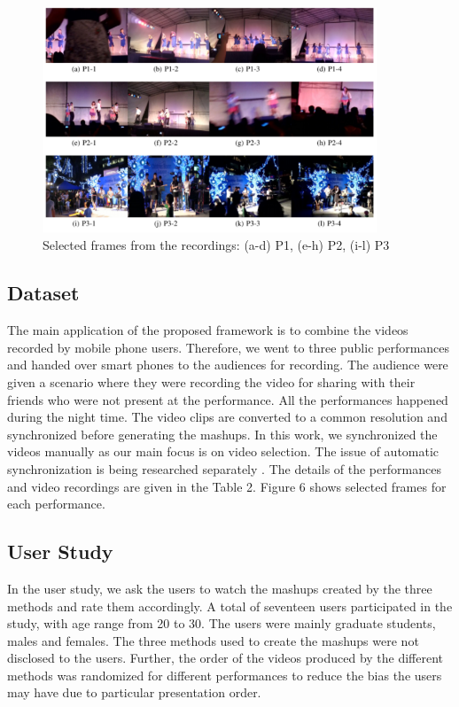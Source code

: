 \documentclass{sig-alternate}
\begin{document}
\begin{figure}[htp]
\centering
\includegraphics[width = 10cm]{images/img6.png}
\caption{Selected frames from the recordings: (a-d) P1, (e-h) P2, (i-l) P3}
\end{figure}


\subsection{Dataset}
The main application of the proposed framework is to combine
the videos recorded by mobile phone users. Therefore, we went to
three public performances and handed over smart phones to the audiences for recording. The audience were given a scenario where
they were recording the video for sharing with their friends who
were not present at the performance. All the performances happened during the night time. The video clips are converted to a
common resolution and synchronized before generating the mashups.
In this work, we synchronized the videos manually as our main focus is on video selection. The issue of automatic synchronization is
being researched separately \cite{14}. The details of the performances
and video recordings are given in the Table 2. Figure 6 shows selected frames for each performance.

\subsection{User Study}
In the user study, we ask the users to watch the mashups created
by the three methods and rate them accordingly. A total of seventeen users participated in the study, with age range from 20 to 30.
The users were mainly graduate students, males and females. The
three methods used to create the mashups were not disclosed to the
users. Further, the order of the videos produced by the different
methods was randomized for different performances to reduce the
bias the users may have due to particular presentation order.
\end{document}
